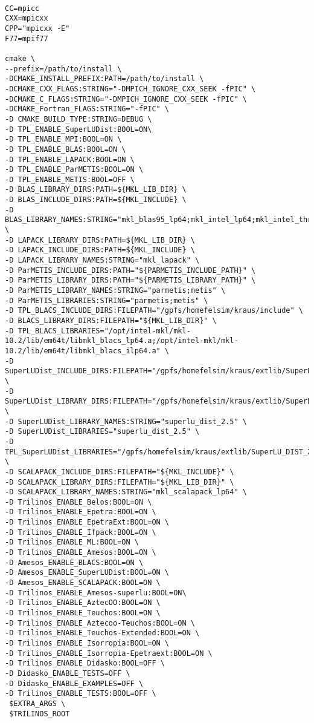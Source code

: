 \begin{footnotesize}
\begin{verbatim}

CC=mpicc
CXX=mpicxx
CPP="mpicxx -E" 
F77=mpif77 

cmake \
--prefix=/path/to/install \
-DCMAKE_INSTALL_PREFIX:PATH=/path/to/install \
-DCMAKE_CXX_FLAGS:STRING="-DMPICH_IGNORE_CXX_SEEK -fPIC" \
-DCMAKE_C_FLAGS:STRING="-DMPICH_IGNORE_CXX_SEEK -fPIC" \
-DCMAKE_Fortran_FLAGS:STRING="-fPIC" \
-D CMAKE_BUILD_TYPE:STRING=DEBUG \
-D TPL_ENABLE_SuperLUDist:BOOL=ON\
-D TPL_ENABLE_MPI:BOOL=ON \
-D TPL_ENABLE_BLAS:BOOL=ON \
-D TPL_ENABLE_LAPACK:BOOL=ON \
-D TPL_ENABLE_ParMETIS:BOOL=ON \
-D TPL_ENABLE_METIS:BOOL=OFF \
-D BLAS_LIBRARY_DIRS:PATH=${MKL_LIB_DIR} \
-D BLAS_INCLUDE_DIRS:PATH=${MKL_INCLUDE} \
-D BLAS_LIBRARY_NAMES:STRING="mkl_blas95_lp64;mkl_intel_lp64;mkl_intel_thread;mkl_core;pthread;guide" \
-D LAPACK_LIBRARY_DIRS:PATH=${MKL_LIB_DIR} \
-D LAPACK_INCLUDE_DIRS:PATH=${MKL_INCLUDE} \
-D LAPACK_LIBRARY_NAMES:STRING="mkl_lapack" \
-D ParMETIS_INCLUDE_DIRS:PATH="${PARMETIS_INCLUDE_PATH}" \
-D ParMETIS_LIBRARY_DIRS:PATH="${PARMETIS_LIBRARY_PATH}" \
-D ParMETIS_LIBRARY_NAMES:STRING="parmetis;metis" \
-D ParMETIS_LIBRARIES:STRING="parmetis;metis" \
-D TPL_BLACS_INCLUDE_DIRS:FILEPATH="/gpfs/homefelsim/kraus/include" \
-D BLACS_LIBRARY_DIRS:FILEPATH="${MKL_LIB_DIR}" \
-D TPL_BLACS_LIBRARIES="/opt/intel-mkl/mkl-10.2/lib/em64t/libmkl_blacs_lp64.a;/opt/intel-mkl/mkl-10.2/lib/em64t/libmkl_blacs_ilp64.a" \
-D SuperLUDist_INCLUDE_DIRS:FILEPATH="/gpfs/homefelsim/kraus/extlib/SuperLU_DIST_2.5/include" \
-D SuperLUDist_LIBRARY_DIRS:FILEPATH="/gpfs/homefelsim/kraus/extlib/SuperLU_DIST_2.5/lib" \
-D SuperLUDist_LIBRARY_NAMES:STRING="superlu_dist_2.5" \
-D SuperLUDist_LIBRARIES="superlu_dist_2.5" \
-D TPL_SuperLUDist_LIBRARIES="/gpfs/homefelsim/kraus/extlib/SuperLU_DIST_2.5/lib/libsuperlu_dist_2.5.a" \
-D SCALAPACK_INCLUDE_DIRS:FILEPATH="${MKL_INCLUDE}" \
-D SCALAPACK_LIBRARY_DIRS:FILEPATH="${MKL_LIB_DIR}" \
-D SCALAPACK_LIBRARY_NAMES:STRING="mkl_scalapack_lp64" \
-D Trilinos_ENABLE_Belos:BOOL=ON \
-D Trilinos_ENABLE_Epetra:BOOL=ON \
-D Trilinos_ENABLE_EpetraExt:BOOL=ON \
-D Trilinos_ENABLE_Ifpack:BOOL=ON \
-D Trilinos_ENABLE_ML:BOOL=ON \
-D Trilinos_ENABLE_Amesos:BOOL=ON \
-D Amesos_ENABLE_BLACS:BOOL=ON \
-D Amesos_ENABLE_SuperLUDist:BOOL=ON \
-D Amesos_ENABLE_SCALAPACK:BOOL=ON \
-D Trilinos_ENABLE_Amesos-superlu:BOOL=ON\
-D Trilinos_ENABLE_AztecOO:BOOL=ON \
-D Trilinos_ENABLE_Teuchos:BOOL=ON \
-D Trilinos_ENABLE_Aztecoo-Teuchos:BOOL=ON \
-D Trilinos_ENABLE_Teuchos-Extended:BOOL=ON \
-D Trilinos_ENABLE_Isorropia:BOOL=ON \
-D Trilinos_ENABLE_Isorropia-Epetraext:BOOL=ON \
-D Trilinos_ENABLE_Didasko:BOOL=OFF \
-D Didasko_ENABLE_TESTS=OFF \
-D Didasko_ENABLE_EXAMPLES=OFF \
-D Trilinos_ENABLE_TESTS:BOOL=OFF \
 $EXTRA_ARGS \
 $TRILINOS_ROOT
\end{verbatim}
\end{footnotesize}


